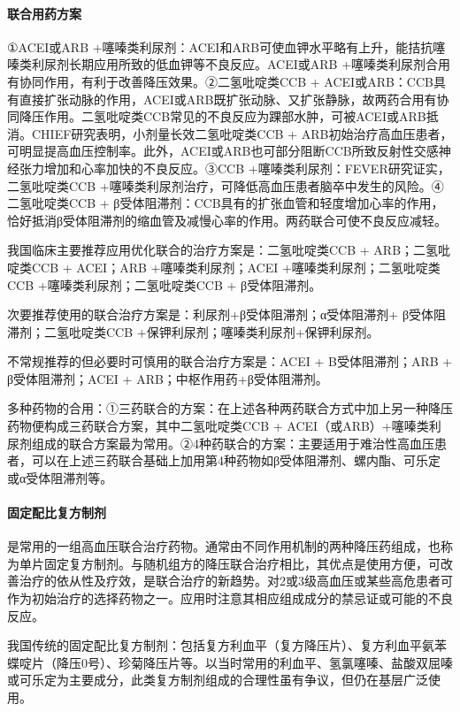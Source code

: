 \paragraph{联合用药方案}

①ACEI或ARB
+噻嗪类利尿剂：ACEI和ARB可使血钾水平略有上升，能拮抗噻嗪类利尿剂长期应用所致的低血钾等不良反应。ACEI或ARB
+噻嗪类利尿剂合用有协同作用，有利于改善降压效果。②二氢吡啶类CCB +
ACEI或ARB：CCB具有直接扩张动脉的作用，ACEI或ARB既扩张动脉、又扩张静脉，故两药合用有协同降压作用。二氢吡啶类CCB常见的不良反应为踝部水肿，可被ACEI或ARB抵消。CHIEF研究表明，小剂量长效二氢吡啶类CCB
+
ARB初始治疗高血压患者，可明显提高血压控制率。此外，ACEI或ARB也可部分阻断CCB所致反射性交感神经张力增加和心率加快的不良反应。③CCB
+噻嗪类利尿剂：FEVER研究证实，二氢吡啶类CCB
+噻嗪类利尿剂治疗，可降低高血压患者脑卒中发生的风险。④二氢吡啶类CCB +
β受体阻滞剂：CCB具有的扩张血管和轻度增加心率的作用，恰好抵消β受体阻滞剂的缩血管及减慢心率的作用。两药联合可使不良反应减轻。

我国临床主要推荐应用优化联合的治疗方案是：二氢吡啶类CCB +
ARB；二氢吡啶类CCB + ACEI；ARB +噻嗪类利尿剂；ACEI
+噻嗪类利尿剂；二氢吡啶类CCB +噻嗪类利尿剂；二氢吡啶类CCB +
β受体阻滞剂。

次要推荐使用的联合治疗方案是：利尿剂+β受体阻滞剂；α受体阻滞剂+
β受体阻滞剂；二氢吡啶类CCB +保钾利尿剂；噻嗪类利尿剂+保钾利尿剂。

不常规推荐的但必要时可慎用的联合治疗方案是：ACEI + B受体阻滞剂；ARB +
β受体阻滞剂；ACEI + ARB；中枢作用药+β受体阻滞剂。

多种药物的合用：①三药联合的方案：在上述各种两药联合方式中加上另一种降压药物便构成三药联合方案，其中二氢吡啶类CCB
+
ACEI（或ARB）+噻嗪类利尿剂组成的联合方案最为常用。②4种药联合的方案：主要适用于难治性高血压患者，可以在上述三药联合基础上加用第4种药物如β受体阻滞剂、螺内酯、可乐定或α受体阻滞剂等。

\paragraph{固定配比复方制剂}

是常用的一组高血压联合治疗药物。通常由不同作用机制的两种降压药组成，也称为单片固定复方制剂。与随机组方的降压联合治疗相比，其优点是使用方便，可改善治疗的依从性及疗效，是联合治疗的新趋势。对2或3级高血压或某些高危患者可作为初始治疗的选择药物之一。应用时注意其相应组成成分的禁忌证或可能的不良反应。

我国传统的固定配比复方制剂：包括复方利血平（复方降压片）、复方利血平氨苯蝶啶片（降压0号）、珍菊降压片等。以当时常用的利血平、氢氯噻嗪、盐酸双屈嗪或可乐定为主要成分，此类复方制剂组成的合理性虽有争议，但仍在基层广泛使用。

